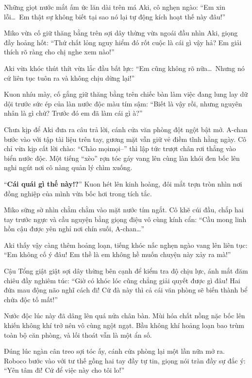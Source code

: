 \documentclass[../main.tex]{subfiles}
\begin{document}
\chrint

Những giọt nước mắt ấm ức lăn dài trên má Aki, cô nghẹn ngào:
``Em xin lỗi\dots\ Em thật sự không biết tại sao nó lại tự động kích hoạt thế này đâu!''

Miko vừa cố giữ thăng bằng trên sợi dây thừng vừa ngoái đầu nhìn Aki, giọng đầy hoảng hốt:
``Thứ chất lỏng nguy hiểm đó rốt cuộc là cái gì vậy hả? Em giải thích rõ ràng cho chị nghe xem nào!''


Aki vừa khóc thút thít vừa lắc đầu bất lực:
``Em cũng không rõ nữa\dots\ Nhưng nó cứ liên tục tuôn ra và không chịu dừng lại!''

Kuon nhíu mày, cố gắng giữ thăng bằng trên chiếc bàn làm việc đang lung lay dữ dội trước sức ép của làn nước độc màu tím sậm:
``Biết là vậy rồi, nhưng nguyên nhân là gì chứ? Trước đó em đã làm cái gì à?''

Chưa kịp để Aki đưa ra câu trả lời, cánh cửa văn phòng đột ngột bật mở. A-chan bước vào với tập tài liệu trên tay, gương mặt vẫn giữ vẻ điềm tĩnh hằng ngày. Cô chỉ vừa kịp cất lời chào: ``Chào mọimọi--'' thì lập tức trượt chân rơi thẳng vào biển nước độc. Một tiếng ``xèo'' rợn tóc gáy vang lên cùng làn khói đen bốc lên nghi ngút nơi cô nàng quản lý chìm xuống.


``\textbf{Cái quái gì thế này!?}'' Kuon hét lên kinh hoàng, đôi mắt trợn tròn nhìn nơi đồng nghiệp của mình vừa bốc hơi trong tích tắc.

Miko sững sờ nhìn chằm chằm vào mặt nước tím ngắt. Cô khẽ cúi đầu, chắp hai tay trước ngực và cầu nguyện bằng giọng điệu vô cùng kính cẩn:
``Cầu mong linh hồn cậu được yên nghỉ nơi chín suối, A-chan\dots''

Aki thấy vậy càng thêm hoảng loạn, tiếng khóc nấc nghẹn ngào vang lên liên tục: ``Em không cố ý đâu! Em thề là em không hề muốn chuyện này xảy ra mà!''

Cậu Tổng giật giật sợi dây thừng bên cạnh để kiểm tra độ chịu lực, ánh mắt đăm chiêu đầy nghiêm túc: ``Giờ có khóc lóc cũng chẳng giải quyết được gì đâu! Hai đứa mau động não nghĩ cách đi! Cứ đà này thì cả cái văn phòng sẽ biến thành bể chứa độc tố mất!''

Nước độc lúc này đã dâng lên quá nửa chân bàn. Mùi hóa chất nồng nặc bốc lên khiến không khí trở nên vô cùng ngột ngạt. Bầu không khí hoảng loạn bao trùm toàn bộ căn phòng, và lối thoát vẫn là một ẩn số.

Đúng lúc ngàn cân treo sợi tóc ấy, cánh cửa phòng lại một lần nữa mở ra. Roboco bước vào với tư thế gồng hai tay đầy tự tin, giọng nói tràn đầy sự đắc ý:
``Yên tâm đi! Cứ để việc này cho tôi lo!''
\end{document}
